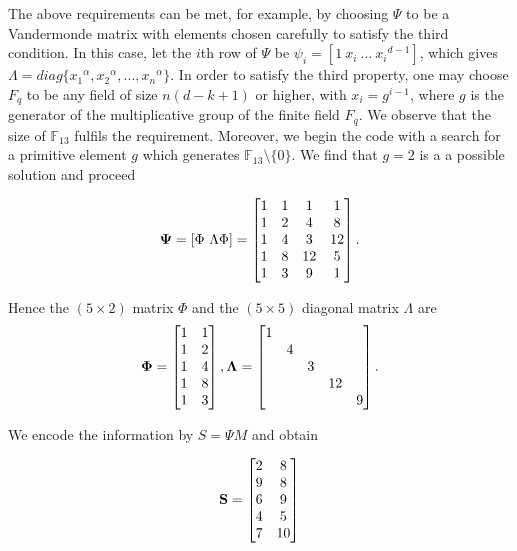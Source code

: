 \documentclass{article}
\begin{document}
The above requirements can be met, for example, by choosing $\Psi$ to be a Vandermonde matrix with elements chosen carefully to satisfy the third condition. In this case, let the $i$th row of $\Psi$ be $\psi_i = [1\ x_i \ ... \ {x_i}^{d-1} ]$, which gives $\Lambda = diag\{{x_1}^{\alpha}, {x_2}^{\alpha}, ... , {x_n}^{\alpha}\}$. In order to satisfy the third property, one may choose $F_q$ to be any field of size $n(d-k+1)$ or higher, with $x_i= g^{i-1}$, where $g$ is the generator of the multiplicative group of the finite field $F_q$. We observe that the size of $\mathbb{F}_{13}$ fulfils the requirement. Moreover, we begin the code with a search for a primitive element $g$ which generates $\mathbb{F}_{13}\setminus\{0\}$. We find that $g=2$ is a a possible solution and proceed

\begin{equation*}
\vb{\Psi} = [\Phi \text{ }\Lambda\Phi] =
\begin{bmatrix}
1 & 1 & 1 & 1 \\
1 & 2 & 4 & 8 \\
1 & 4 & 3 & 12 \\
1 & 8 & 12 & 5 \\
1 & 3 & 9 & 1 
\end{bmatrix}.
\end{equation*}

Hence the $(5 \times 2)$ matrix $\Phi$ and the $(5 \times 5)$ diagonal matrix $\Lambda$ are
\begin{equation*}
\vb{\Phi} =
\begin{bmatrix}
1 & 1\\
1 & 2\\
1 & 4\\
1 & 8\\
1 & 3
\end{bmatrix},\\
\vb{\Lambda} = 
\begin{bmatrix}
1 & & & & \\
& 4 & & & \\
& & 3 & & \\
& & & 12 & \\
& & & & 9
\end{bmatrix}.
\end{equation*}

We encode the information by $S=\Psi M$ and obtain

\begin{equation*}
\vb{S} =
\begin{bmatrix}
2 & 8 \\
9 & 8 \\
6 & 9 \\
4 & 5 \\
7 & 10 \\
\end{bmatrix}
\end{equation*}
\end{document}
